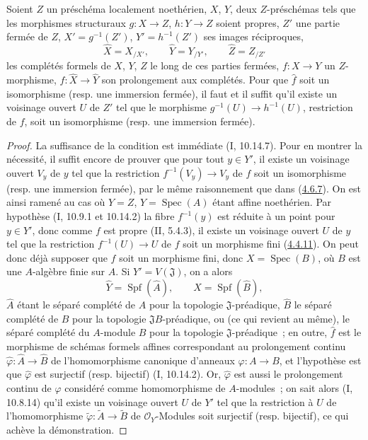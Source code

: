 \begin{proposition}[4.6.8]
\label{III.4.6.8-fr}
Soient $Z$ un préschéma localement noethérien, $X$, $Y$, deux $Z$-préschémas
tels que les morphismes structuraux $g:X\to Z$, $h:Y\to Z$ soient propres,
$Z'$ une partie fermée de $Z$, $X'=g^{-1}(Z')$, $Y'=h^{-1}(Z')$ ses images
réciproques,
\[
\widehat X=X_{/X'},\qquad
\widehat Y=Y_{/Y'},\qquad
\widehat Z=Z_{/Z'}
\]
les complétés formels de $X$, $Y$, $Z$ le long de ces parties fermées,
$f:X\to Y$ un $Z$-morphisme, $\widehat f:\widehat X\to\widehat Y$ son
prolongement aux complétés. Pour que $\widehat f$ soit un isomorphisme (resp.
une immersion fermée), il faut et il suffit qu'il existe un voisinage ouvert
$U$ de $Z'$ tel que le morphisme $g^{-1}(U)\to h^{-1}(U)$, restriction de
$f$, soit un isomorphisme (resp. une immersion fermée).
\end{proposition}

\begin{proof}
La suffisance de la condition est immédiate (I, 10.14.7). Pour en montrer la
nécessité, il suffit encore de prouver que pour tout $y\in Y'$, il existe un
voisinage ouvert $V_y$ de $y$ tel que la restriction
$f^{-1}(V_y)\to V_y$ de $f$ soit un isomorphisme (resp. une immersion
fermée), par le même raisonnement que dans
(\hyperref[III.4.6.7-fr]{4.6.7}). On est ainsi ramené au cas où $Y=Z$,
$Y=\operatorname{Spec}(A)$ étant affine noethérien. Par hypothèse
(I, 10.9.1 et 10.14.2) la fibre $f^{-1}(y)$ est réduite à un point pour
$y\in Y'$, donc comme $f$ est propre (II, 5.4.3), il existe un voisinage
ouvert $U$ de $y$ tel que la restriction $f^{-1}(U)\to U$ de $f$ soit un
morphisme fini (\hyperref[III.4.4.11-fr]{4.4.11}). On peut donc déjà supposer
que $f$ soit un morphisme fini, donc $X=\operatorname{Spec}(B)$, où $B$ est
une $A$-algèbre finie sur $A$. Si $Y'=V(\mathfrak J)$, on a alors
\[
\widehat Y=\operatorname{Spf}(\widehat A),\qquad
\widehat X=\operatorname{Spf}(\widehat B),
\]
$\widehat A$ étant le séparé complété de $A$ pour la topologie
$\mathfrak J$-préadique, $\widehat B$ le séparé complété de $B$ pour la
topologie $\mathfrak JB$-préadique, ou (ce qui revient au même), le séparé
complété du $A$-module $B$ pour la topologie $\mathfrak J$-préadique~; en
outre, $\widehat f$ est le morphisme de schémas formels affines correspondant
au prolongement continu $\widehat\varphi:\widehat A\to\widehat B$ de
l'homomorphisme canonique d'anneaux $\varphi:A\to B$, et l'hypothèse est que
$\widehat\varphi$ est surjectif (resp. bijectif) (I, 10.14.2). Or,
$\widehat\varphi$ est aussi le prolongement continu de $\varphi$ considéré
comme homomorphisme de $A$-modules~; on sait alors (I, 10.8.14) qu'il existe
un voisinage ouvert $U$ de $Y'$ tel que la restriction à $U$ de
l'homomorphisme $\widetilde\varphi:\widetilde A\to\widetilde B$ de
$\mathcal O_Y$-Modules soit surjectif (resp. bijectif), ce qui achève la
démonstration.
\end{proof}

